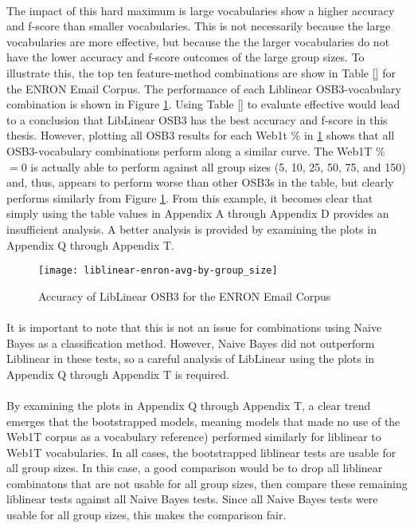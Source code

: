 	\paragraph*{} The impact of this hard maximum is large vocabularies show a higher accuracy and f-score than smaller vocabularies.  This is not necessarily because the large vocabularies are more effective, but because the the larger vocabularies do not have the lower accuracy and f-score outcomes of the large group sizes.  To illustrate this, the top ten feature-method combinations are show in Table \ref{} for the ENRON Email Corpus.  The performance of each Liblinear OSB3-vocabulary combination is shown in Figure \ref{fig:plot-liblinear-enron-accuracy}. Using Table \ref{} to evaluate effective would lead to a conclusion that LibLinear OSB3 has the best accuracy and f-score in this thesis.  However, plotting all OSB3 results for each Web1t \%  in \ref{fig:plot-liblinear-enron-accuracy} shows that all OSB3-vocabulary combinations perform along a similar curve.  The Web1T \% $= 0$ is actually able to perform against all group sizes (5, 10, 25, 50, 75, and 150) and, thus, appears to perform worse than other OSB3s in the table, but clearly performs similarly from Figure \ref{fig:plot-liblinear-enron-accuracy}.  From this example, it becomes clear that simply using the table values in Appendix A through Appendix D provides an insufficient analysis.  A better analysis is provided by examining the plots in Appendix Q through Appendix T.  
	
\begin{figure}[ht]
	\centering
	\texttt{[image: liblinear-enron-avg-by-group\_size]}
	\caption{Accuracy of LibLinear OSB3 for the ENRON Email Corpus}
	\label{fig:plot-liblinear-enron-accuracy}
\end{figure}
	
	\paragraph*{}It is important to note that this is not an issue for combinations using Naive Bayes as a classification method.  However, Naive Bayes did not outperform Liblinear in these tests, so a careful analysis of LibLinear using the plots in Appendix Q through Appendix T is required.

	\paragraph*{} By examining the plots in Appendix Q through Appendix T, a clear trend emerges that the bootstrapped models, meaning models that made no use of the Web1T corpus as a vocabulary reference) performed similarly for liblinear to Web1T vocabularies.  In all cases, the bootstrapped liblinear tests are usable for all group sizes.  In this case, a good comparison would be to drop all liblinear combinatons that are not usable for all group sizes, then compare these remaining liblinear tests against all Naive Bayes tests.  Since all Naive Bayes tests were usable for all group sizes, this makes the comparison fair.
	
